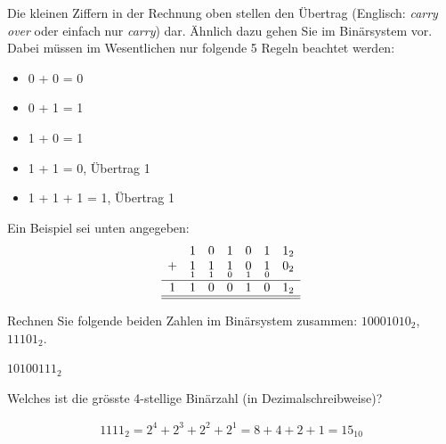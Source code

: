 Die kleinen Ziffern in der Rechnung oben stellen den Übertrag (Englisch: \textit{carry over} oder einfach nur \textit{carry}) dar. Ähnlich dazu gehen Sie im Binärsystem vor. Dabei müssen im Wesentlichen nur folgende 5 Regeln beachtet werden:

\begin{itemize}
	\item 0 + 0 = 0
	\item 0 + 1 = 1
	\item 1 + 0 = 1
	\item 1 + 1 = 0, Übertrag 1
	\item 1 + 1 + 1 = 1, Übertrag 1
\end{itemize}

Ein Beispiel sei unten angegeben:
\[
	\begin{array}{ccccccc}
		  & 1               & 0               & 1               & 0               & 1               & 1_2              \\
		+ & \underset{1}{1} & \underset{1}{1} & \underset{0}{1} & \underset{1}{0} & \underset{0}{1} & \underset{}{0_2} \\
		\hline
		1 & 1               & 0               & 0               & 1               & 0               & 1_2              \\\hline\hline
	\end{array}
\]

\begin{myexercise}
	Rechnen Sie folgende beiden Zahlen im Binärsystem zusammen: $10001010_2$, $11101_2$.
	\begin{myanswer}
		$10100111_2$
	\end{myanswer}
\end{myexercise}

\begin{myexercise}
	Welches ist die grösste 4-stellige Binärzahl (in Dezimalschreibweise)?
	\begin{myanswer}
		\begin{align*}
			1111_2 = 2^4 + 2^3 + 2^2 + 2^1 = 8 + 4 + 2 + 1 = 15_{10}
		\end{align*}
	\end{myanswer}
\end{myexercise}

